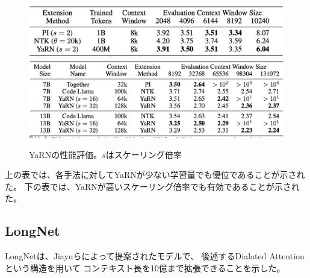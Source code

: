 \documentclass{jsarticle}
\begin{document}
            \begin{figure}[ht]
                \caption{YaRNの性能評価\cite{yarn}。$s$はスケーリング倍率}
                \label{tab:yarn}
                \begin{center}
                    \includegraphics[width=.8\hsize]{yarn1.png}
                    \includegraphics[width=\hsize]{yarn2.png}
                \end{center}
            \end{figure}

            上の表では、各手法に対してYaRNが少ない学習量でも優位であることが示された。
            下の表では、YaRNが高いスケーリング倍率でも有効であることが示された。

    \subsection{LongNet}
        LongNetは、Jiayuら\cite{longnet}によって提案されたモデルで、
        後述するDialated Attentionという構造を用いて
        コンテキスト長を10億まで拡張できることを示した。
\end{document}
